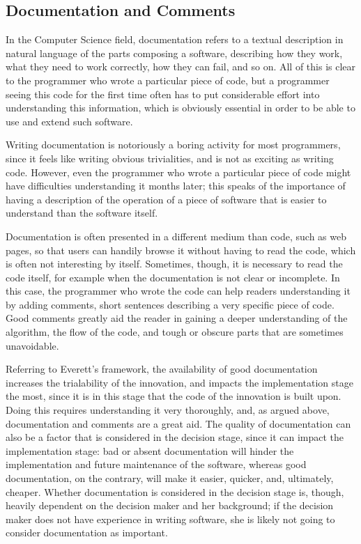 \documentclass[12pt]{article}
\begin{document}
\subsection{Documentation and Comments}
\label{sec:org9b4a1c7}
In the Computer Science field, documentation refers to a textual description in natural language of the parts composing a software, describing how they work, what they need to work correctly, how they can fail, and so on. All of this is clear to the programmer who wrote a particular piece of code, but a programmer seeing this code for the first time often has to put considerable effort into understanding this information, which is obviously essential in order to be able to use and extend such software.

Writing documentation is notoriously a boring activity for most programmers, since it feels like writing obvious trivialities, and is not as exciting as writing code. However, even the programmer who wrote a particular piece of code might have difficulties understanding it months later; this speaks of the importance of having a description of the operation of a piece of software that is easier to understand than the software itself.

Documentation is often presented in a different medium than code, such as web pages, so that users can handily browse it without having to read the code, which is often not interesting by itself. Sometimes, though, it is necessary to read the code itself, for example when the documentation is not clear or incomplete. In this case, the programmer who wrote the code can help readers understanding it by adding comments, short sentences describing a very specific piece of code. Good comments greatly aid the reader in gaining a deeper understanding of the algorithm, the flow of the code, and tough or obscure parts that are sometimes unavoidable.

Referring to Everett's framework, the availability of good documentation increases the trialability of the innovation, and impacts the implementation stage the most, since it is in this stage that the code of the innovation is built upon. Doing this requires understanding it very thoroughly, and, as argued above, documentation and comments are a great aid. The quality of documentation can also be a factor that is considered in the decision stage, since it can impact the implementation stage: bad or absent documentation will hinder the implementation and future maintenance of the software, whereas good documentation, on the contrary, will make it easier, quicker, and, ultimately, cheaper. Whether documentation is considered in the decision stage is, though, heavily dependent on the decision maker and her background; if the decision maker does not have experience in writing software, she is likely not going to consider documentation as important.
\end{document}
